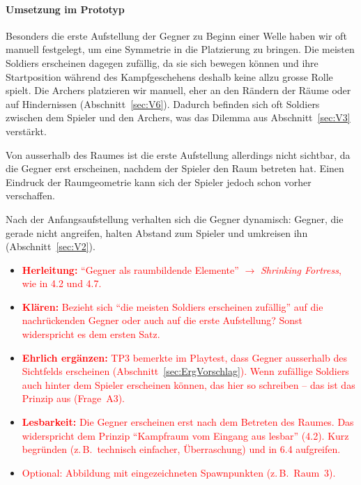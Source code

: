 \documentclass[../Main.tex]{subfiles}
\begin{document}
\paragraph{Umsetzung im Prototyp}
Besonders die erste Aufstellung der Gegner zu Beginn einer Welle haben wir oft manuell festgelegt, um eine Symmetrie in die Platzierung zu bringen. Die meisten Soldiers erscheinen dagegen zufällig, da sie sich bewegen können und ihre Startposition während des Kampfgeschehens deshalb keine allzu grosse Rolle spielt. Die Archers platzieren wir manuell, eher an den Rändern der Räume oder auf Hindernissen (Abschnitt~\ref{sec:V6}). Dadurch befinden sich oft Soldiers zwischen dem Spieler und den Archers, was das Dilemma aus Abschnitt~\ref{sec:V3} verstärkt.

Von ausserhalb des Raumes ist die erste Aufstellung allerdings nicht sichtbar, da die Gegner erst erscheinen, nachdem der Spieler den Raum betreten hat. Einen Eindruck der Raumgeometrie kann sich der Spieler jedoch schon vorher verschaffen.

Nach der Anfangsaufstellung verhalten sich die Gegner dynamisch: Gegner, die gerade nicht angreifen, halten Abstand zum Spieler und umkreisen ihn (Abschnitt~\ref{sec:V2}).

\begin{itemize}[leftmargin=1.5cm]
    \item \textcolor{red}{\textbf{Herleitung:} \enquote{Gegner als raumbildende Elemente} $\rightarrow$ \textit{Shrinking Fortress}, wie in 4.2 und 4.7.}
    \item \textcolor{red}{\textbf{Klären:} Bezieht sich \enquote{die meisten Soldiers erscheinen zufällig} auf die nachrückenden Gegner oder auch auf die erste Aufstellung? Sonst widerspricht es dem ersten Satz.}
    \item \textcolor{red}{\textbf{Ehrlich ergänzen:} TP3 bemerkte im Playtest, dass Gegner ausserhalb des Sichtfelds erscheinen (Abschnitt~\ref{sec:ErgVorschlag}). Wenn zufällige Soldiers auch hinter dem Spieler erscheinen können, das hier so schreiben -- das ist das Prinzip aus  (Frage~A3).}
    \item \textcolor{red}{\textbf{Lesbarkeit:} Die Gegner erscheinen erst nach dem Betreten des Raumes. Das widerspricht dem Prinzip \enquote{Kampfraum vom Eingang aus lesbar} (4.2). Kurz begründen (z.\,B.\ technisch einfacher, Überraschung) und in 6.4 aufgreifen.}
    \item \textcolor{red}{Optional: Abbildung mit eingezeichneten Spawnpunkten (z.\,B.\ Raum~3).}
\end{itemize}
\end{document}
